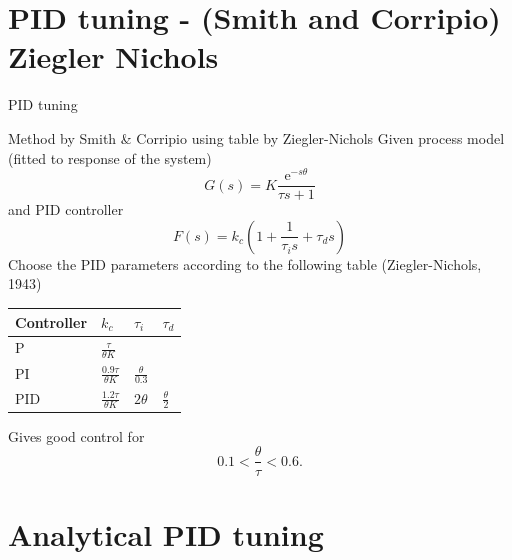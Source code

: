 \documentclass[presentation,aspectratio=169, usenames, dvipsnames]{beamer}
\begin{document}
\section{PID tuning - (Smith and Corripio) Ziegler Nichols}
\label{sec:orgb463b90}
\begin{frame}[label={sec:org777da4e}]{PID tuning}
\end{frame}
\begin{frame}[label={sec:org5924c53}]{Method by Smith \& Corripio using table by Ziegler-Nichols}
Given process model (fitted to response of the system) \[ G(s) = K \frac{\mathrm{e}^{-s\theta}}{\tau s + 1} \] and PID controller
\[ F(s) = k_c\left( 1 + \frac{1}{\tau_i s} + \tau_d s\right) \]
Choose the PID parameters according to the following table (Ziegler-Nichols, 1943)
   \begin{center}
   \setlength{\tabcolsep}{20pt}
   \renewcommand{\arraystretch}{1.5}
   \begin{tabular}{llll}
   Controller & \(k_c\) & \(\tau_i\) & \(\tau_d\)\\
  \hline\hline
  P & \(\frac{\tau}{\theta K}\) &  & \\
  PI & \(\frac{0.9\tau}{\theta K}\) & \(\frac{\theta}{0.3}\) & \\
  PID & \(\frac{1.2\tau}{\theta K}\) & \(2\theta\) & \(\frac{\theta}{2}\)\\
  \hline
\end{tabular}
\end{center}

Gives good control for \[0.1 < \frac{\theta}{\tau} < 0.6.\]
\end{frame}



\section{Analytical PID tuning}
\label{sec:orgf9d0d46}
\end{document}
